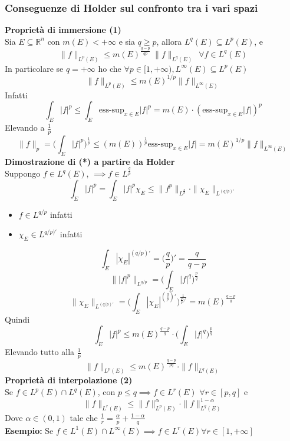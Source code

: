\documentclass[a4paper]{article}
\newcommand{\R}{\mathbb{R}}
\begin{document}
\subsubsection{Conseguenze di Holder sul confronto tra i vari spazi}
\textbf{Proprietà di immersione (1)}\\ 
Sia $E\subseteq \R^n$ con $m(E)<+\infty$ e sia $q\ge p$, allora $L^q(E)\subseteq L^p(E)$, e 
\[\|f\|_{L^p(E)}\le m(E)^{\frac{q-p}{qp}}\ \|f\|_{L^q(E)}\ \ \forall f\in L^q(E)\]
In particolare se $q=+\infty$ ho che $\forall p\in[1,+\infty),L^\infty(E)\subseteq L^p(E)$
\[\|f\|_{L^p(E)}\le m(E)^{1 / p}\|f\|_{L^\infty(E)}\]
Infatti
\[\int_{E}^{} |f|^p\le \int_{E}^{} \text{ess-sup}_{x\in E}|f|^p=m(E)\cdot (\text{ess-sup}_{x\in E}|f|)^p\]
Elevando a $\frac{1}{p}$
\[\|f\|_p=\bigg(\int_{E}{|f|^p\bigg)^{\frac{1}{p}}}\le (m(E))^{\frac{1}{p}}\text{ess-sup}_{x\in E}|f|=m(E)^{1 / p}\|f\|_{L^\infty(E)}  \]
\textbf{Dimostrazione di (*) a partire da Holder}\\
Suppongo $f\in L^q(E)$, $\implies f\in L^{\frac{q}{p}}$
\[\int_{E}^{} |f|^p=\int_{E}^{} |f|^p\chi_E \le \|f^p\|_{L^{\frac{q}{p}}}\cdot \|\chi_E\|_{L^{(q / p)'}}\]
\begin{itemize}
	\item $f\in L^{q / p}$ infatti 
	\item $\chi_E\in L^{q / p )'}$ infatti
\end{itemize}
\[\int_{E}^{} |\chi_E|^{(q / p)'}=\bigg(\frac{q}{p}\bigg)'=\frac{q}{q-p}\]
\[\ \| |f|^p\|_{L^{q / p}}=\bigg(\int_{E}^{} |f|^q\bigg)^{\frac{p}{q}}\]
\[\|\chi_E\|_{L^{(q / p)'}}=\bigg( \int_{E}^{} |\chi_E|^{(\frac{q}{p})'}\bigg)^{\frac{1}{\frac{q}{p})'}}=m(E)^{\frac{q-p}{q}}\]
Quindi
\[\int_{E}^{} |f|^p\le m(E)^{\frac{q-p}{q}}\cdot \bigg(\int_{E}^{} |f|^q\bigg)^{\frac{p}{q}}\]
Elevando tutto alla $\frac{1}{p}$ 
\[\|f\|_{L^p(E)}\le m(E)^{\frac{q-p}{pq}}\cdot \|f\|_{L^{q}(E)}\]
\textbf{Proprietà di interpolazione (2)}\\
Se $f\in L^p(E)\cap L^q(E)$, con $p\le q\implies f\in L^r(E)$ $\forall  r\in [p,q]$ e
\[\|f\|_{L^r(E)}\le \|f\|_{L^p(E)}^\alpha\cdot \|f\|_{L^{q}(E)}^{1-\alpha}\]
Dove $\alpha\in (0,1)$ tale che $\frac{1}{r}=\frac{\alpha}{p}+\frac{1-\alpha}{q}$\\ 
\textbf{Esempio:} Se $f\in L^{1}(E)\cap L^{\infty}(E)\implies f\in L^{r}(E)\forall r\in [1,+\infty]$
\end{document}
